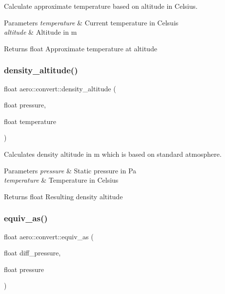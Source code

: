 Calculate approximate temperature based on altitude in Celsius. 


\begin{DoxyParams}{Parameters}
{\em temperature} & Current temperature in Celsuis \\
\hline
{\em altitude} & Altitude in m \\
\hline
\end{DoxyParams}
\begin{DoxyReturn}{Returns}
float Approximate temperature at altitude 
\end{DoxyReturn}
\mbox{\label{namespaceaero_1_1convert_ad11c320fabe5ed6d5356870efe473ed1}} 
\subsubsection{\texorpdfstring{density\+\_\+altitude()}{density\_altitude()}}
{\footnotesize\ttfamily float aero\+::convert\+::density\+\_\+altitude (\begin{DoxyParamCaption}\item[{float}]{pressure,  }\item[{float}]{temperature }\end{DoxyParamCaption})}



Calculates density altitude in m which is based on standard atmosphere. 


\begin{DoxyParams}{Parameters}
{\em pressure} & Static pressure in Pa \\
\hline
{\em temperature} & Temperature in Celsius \\
\hline
\end{DoxyParams}
\begin{DoxyReturn}{Returns}
float Resulting density altitude 
\end{DoxyReturn}
\mbox{\label{namespaceaero_1_1convert_a0805769f0bdd8dd4513c4825ac89e8fa}} 
\subsubsection{\texorpdfstring{equiv\+\_\+as()}{equiv\_as()}}
{\footnotesize\ttfamily float aero\+::convert\+::equiv\+\_\+as (\begin{DoxyParamCaption}\item[{float}]{diff\+\_\+pressure,  }\item[{float}]{pressure }\end{DoxyParamCaption})}



